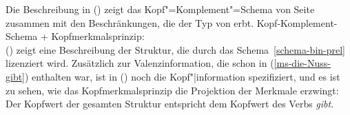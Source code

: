 Die Beschreibung in () zeigt das Kopf"=Komplement"=Schema 
von Seite~\pageref{schema-bin-prel} zusammen mit den
Beschränkungen, die der Typ  von  erbt.
\eas
Kopf-Komplement-Schema + Kopfmerkmalsprinzip:\\
\zs
() zeigt eine Beschreibung der Struktur, die durch das Schema~\ref{schema-bin-prel} lizenziert wird.
Zusätzlich zur Valenzinformation, die schon in (\ref{ms-die-Nuss-gibt}) enthalten war,
ist in () noch die Kopf"|information spezifiziert, und es ist zu sehen, wie
das Kopfmerkmalsprinzip die Projektion der Merkmale erzwingt: Der Kopfwert der gesamten Struktur
 entspricht dem Kopfwert des Verbs \emph{gibt}.
\ea
{}
\z

